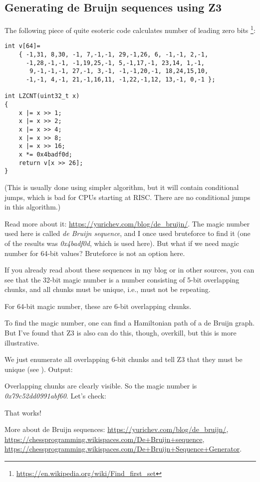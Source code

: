 \subsection{Generating de Bruijn sequences using Z3}
\label{DeBruijnZ3}

The following piece of quite esoteric code calculates number of leading zero bits
\footnote{\url{https://en.wikipedia.org/wiki/Find_first_set}}:

\begin{lstlisting}
int v[64]=
	{ -1,31, 8,30, -1, 7,-1,-1, 29,-1,26, 6, -1,-1, 2,-1,
	  -1,28,-1,-1, -1,19,25,-1, 5,-1,17,-1, 23,14, 1,-1,
	   9,-1,-1,-1, 27,-1, 3,-1, -1,-1,20,-1, 18,24,15,10,
	  -1,-1, 4,-1, 21,-1,16,11, -1,22,-1,12, 13,-1, 0,-1 };

int LZCNT(uint32_t x)
{
    x |= x >> 1;
    x |= x >> 2;
    x |= x >> 4;
    x |= x >> 8;
    x |= x >> 16;
    x *= 0x4badf0d;
    return v[x >> 26];
}
\end{lstlisting}

(This is usually done using simpler algorithm, but it will contain conditional jumps, which is bad for
CPUs starting at RISC. There are no conditional jumps in this algorithm.)

Read more about it: \url{https://yurichev.com/blog/de_bruijn/}.
The magic number used here is called \textit{de Bruijn sequence},
and I once used bruteforce to find it (one of the results was \textit{0x4badf0d}, which is used here).
But what if we need magic number for 64-bit values?
Bruteforce is not an option here.

If you already read about these sequences in my blog or in other sources,
you can see that the 32-bit magic number is a number consisting
of 5-bit overlapping chunks, and all chunks must be unique, i.e., must not be repeating.

For 64-bit magic number, these are 6-bit overlapping chunks.

To find the magic number, one can find a Hamiltonian path of a de Bruijn graph.
But I've found that Z3 is also can do this, though, overkill, but this is more illustrative.



We just enumerate all overlapping 6-bit chunks and tell Z3 that they must be unique (see ).
Output:



Overlapping chunks are clearly visible.
So the magic number is \textit{0x79c52dd0991abf60}.
Let's check:



That works!

More about de Bruijn sequences:
\url{https://yurichev.com/blog/de_bruijn/},
\url{https://chessprogramming.wikispaces.com/De+Bruijn+sequence},
\url{https://chessprogramming.wikispaces.com/De+Bruijn+Sequence+Generator}.

